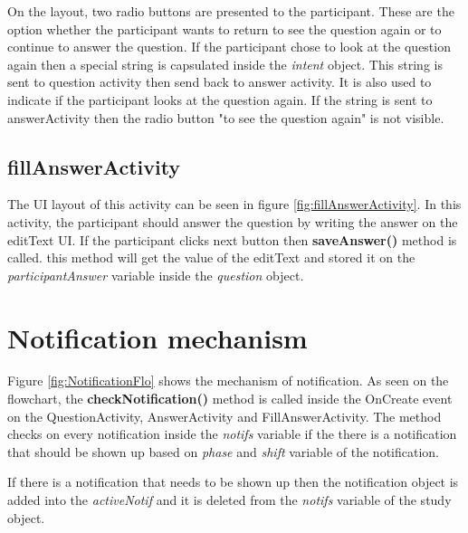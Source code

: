 On the layout, two radio buttons are presented to the participant. These are the option whether the participant wants to return to see the question again or to continue
 to answer the question.
If the participant chose to look at the question again then a special string is capsulated inside the \textit{intent} object.
This string is sent to question activity then send back to answer activity. It is also used to indicate if the participant looks at the question again.
If the string is sent to answerActivity then the radio button "to see the question again" is not visible.


\subsection{fillAnswerActivity}
The UI layout of this activity can be seen in figure \ref{fig:fillAnswerActivity}.
In this activity, the participant should answer the question by writing the answer on the editText UI.
If the participant clicks next button then \textbf{saveAnswer()} method is called. this method will get the value of the editText
and stored it on the \textit{participantAnswer} variable inside the \textit{question} object.


\section{Notification mechanism}
Figure \ref{fig:NotificationFlo} shows the mechanism of notification.
As seen on the flowchart, the \textbf{checkNotification()} method is called inside
the OnCreate event on the QuestionActivity, AnswerActivity and FillAnswerActivity.
The method checks on every notification inside the \textit{notifs} variable if the there is a notification that should be shown up based on \textit{phase} and \textit{shift} variable of the notification.

If there is a notification that needs to be shown up then the notification object is added into the \textit{activeNotif} and it is deleted from the \textit{notifs} variable of the study object.

